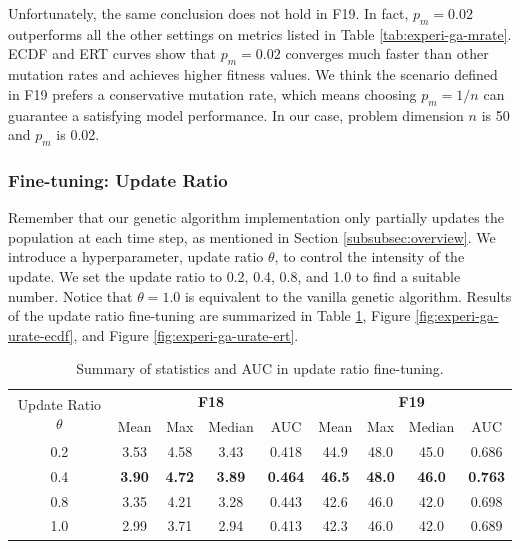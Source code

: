 \documentclass{article}
\begin{document}
Unfortunately, the same conclusion does not hold in F19. In fact, $p_m = 0.02$ outperforms all the other settings on metrics listed in Table \ref{tab:experi-ga-mrate}. ECDF and ERT curves show that $p_m = 0.02$ converges much faster than other mutation rates and achieves higher fitness values. We think the scenario defined in F19 prefers a conservative mutation rate, which means choosing $p_m = 1 / n$ can guarantee a satisfying model performance. In our case, problem dimension $n$ is 50 and $p_m$ is 0.02. 

\subsubsection{Fine-tuning: Update Ratio}
Remember that our genetic algorithm implementation only partially updates the population at each time step, as mentioned in Section \ref{subsubsec:overview}. We introduce a hyperparameter, update ratio $\theta$, to control the intensity of the update. We set the update ratio to 0.2, 0.4, 0.8, and 1.0 to find a suitable number. Notice that $\theta = 1.0$ is equivalent to the vanilla genetic algorithm. Results of the update ratio fine-tuning are summarized in Table \ref{tab:experi-ga-urate}, Figure \ref{fig:experi-ga-urate-ecdf}, and Figure \ref{fig:experi-ga-urate-ert}.

\begin{table}[!ht]
    \centering
    \caption{Summary of statistics and AUC in update ratio fine-tuning.}
    \label{tab:experi-ga-urate}
    \begin{tabular}{ccccccccc}
        \toprule
        \multirow{2}[3]{*}{Update Ratio $\theta$} &
        \multicolumn{4}{c}{\textbf{F18}} &
        \multicolumn{4}{c}{\textbf{F19}}\\
        \cmidrule(lr){2-5}
        \cmidrule(lr){6-9}
        & Mean & Max & Median & AUC & Mean & Max & Median & AUC\\
        \midrule
        0.2 & 3.53 & 4.58 & 3.43 & 0.418 & 44.9 & 48.0 & 45.0 & 0.686 \\
        0.4 & \textbf{3.90} & \textbf{4.72} & \textbf{3.89} & \textbf{0.464} & \textbf{46.5} & \textbf{48.0} & \textbf{46.0} & \textbf{0.763} \\
        0.8 & 3.35 & 4.21 & 3.28 & 0.443 & 42.6 & 46.0 & 42.0 & 0.698 \\
        1.0 & 2.99 & 3.71 & 2.94 & 0.413 & 42.3 & 46.0 & 42.0 & 0.689 \\
        \bottomrule
    \end{tabular}
\end{table}
\end{document}
